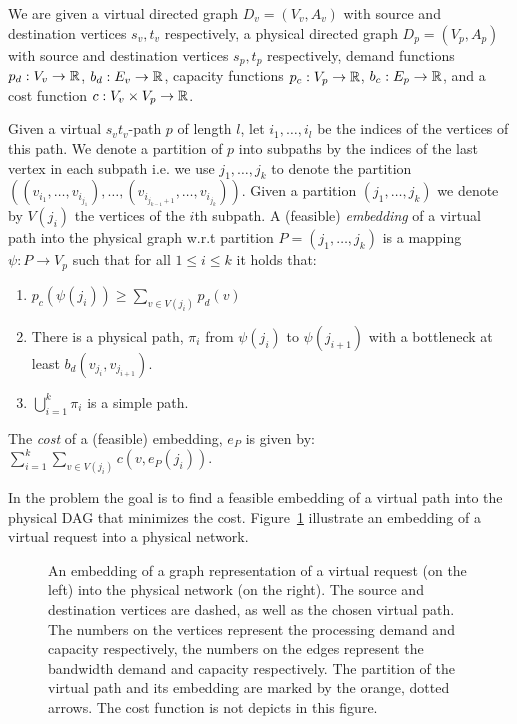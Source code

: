 We are given a virtual directed graph $D_v = (V_v, A_v)$ 
with source and destination vertices $s_v, t_v$ respectively, 
a physical directed graph $D_p = (V_p, A_p)$
with source and destination vertices $s_p, t_p$ respectively,
demand functions $p_d : V_v \to \mathbb{R}$, $b_d : E_v \to \mathbb{R}$,
capacity functions $p_c : V_p \to \mathbb{R}$, $b_c : E_p \to \mathbb{R}$,
and a cost function $c: V_v \times V_p \to \mathbb{R}$. 

Given a virtual $s_vt_v$-path $p$ of length $l$,
let $i_1, \ldots, i_l$ be the indices of the vertices of this path.
We denote a partition of $p$ into subpaths by the indices of the last vertex in
each subpath i.e. we use $j_1, \ldots, j_k$ to denote the partition 
$((v_{i_1}, \ldots, v_{i_{j_1}}), \ldots, (v_{i_{j_{k-1} + 1}}, \ldots,
v_{i_{j_k}}))$.
Given a partition $(j_1, \ldots, j_k)$ we denote by $V(j_i)$ the vertices of the
$i$th subpath.
A (feasible) \emph{embedding} of a virtual path into the physical graph 
w.r.t partition $P = (j_1, \ldots,j_k)$ is a mapping $\psi : P \to V_p$ such that
for all $1 \leq i \leq k$ it holds that:
\begin{enumerate}
  \item $p_c(\psi(j_i)) \geq \sum_{v \in V(j_i)} p_d(v)$
  \item There is a physical path, $\pi_i$ from $\psi(j_i)$ to $\psi(j_{i+1})$ with a
  bottleneck at least $b_d(v_{j_i}, v_{j_{i+1}})$.
  \item $\bigcup_{i = 1}^k \pi_i$ is a simple path.
\end{enumerate}
The \emph{cost} of a (feasible) embedding, $e_P$ is given by:
$\sum_{i = 1}^k \sum_{v \in V(j_i)} c(v, e_P(j_i))$.   

In the \VPN problem the goal is to find a
feasible embedding of a virtual path into the physical DAG that minimizes the
cost.
Figure~\ref{fig:problem} illustrate an embedding of a virtual request into a
physical network. 

\begin{figure}[ht]
\centering
\scalebox{.8}{

}
\caption{
An embedding of a graph representation of a virtual request (on the left) into
the physical network (on the right).
The source and destination vertices are dashed, as well as the chosen virtual
path.
The numbers on the vertices represent the processing demand and capacity
respectively, 
the numbers on the edges represent the bandwidth demand and capacity
respectively.
The partition of the virtual path and its embedding are marked by the orange,
dotted arrows.
The cost function is not depicts in this figure.
\label{fig:problem}
}
\end{figure}

